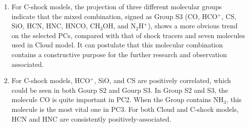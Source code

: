 \documentclass{aa}
\begin{document}
\begin{CJK*}{UTF8}{gbsn}
\begin{enumerate}
      
      \item 
      For C-shock models, the projection of three different molecular groups indicate that the mixed combination, signed as Group S3 (CO, HCO$^+$, CS, SiO, HCN, HNC, HNCO, CH$_3$OH, and N$_2$H$^+$), shows a more obvious trend on the selected PCs, compared with that of shock tracers and seven molecules used in Cloud model. 
      It can postulate that this molecular combination contains a constructive purpose for the further research and observation associated.
      
      \item 
      For C-shock models, HCO$^+$, SiO, and CS are positively correlated, which could be seen in both Gourp S2 and Gourp S3. 
      In Group S2 and S3, the molecule CO is quite important in PC2. 
      When the Group contains NH$_3$, this molecule is the most vital one in PC3. 
      For both Cloud and C-shock models, HCN and HNC are consistently positively-associated. 
      
      
   \end{enumerate}
   
  


%
%




\end{CJK*}
\end{document}
